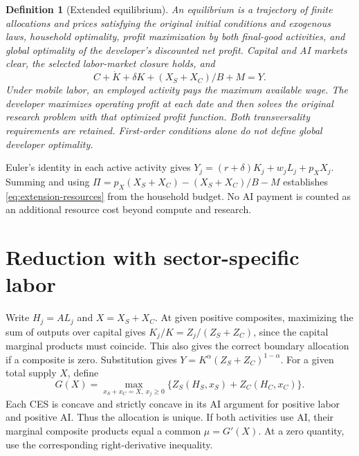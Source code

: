 \documentclass[11pt]{article}
\newtheorem{definition}{Definition}
\begin{document}
\begin{definition}[Extended equilibrium]
An equilibrium is a trajectory of finite allocations and prices satisfying
the original initial conditions and exogenous laws, household optimality,
profit maximization by both final-good activities, and global optimality
of the developer's discounted net profit. Capital and AI markets clear,
the selected labor-market closure holds, and
\begin{equation}
 C+\dot K+\delta K+(X_S+X_C)/B+M=Y.
 \label{eq:extension-resources}
\end{equation}
Under mobile labor, an employed activity pays the maximum available wage.
The developer maximizes operating profit at each date and then solves the
original research problem with that optimized profit function.
Both transversality requirements are retained. First-order conditions alone
do not define global developer optimality.
\end{definition}

Euler's identity in each active activity gives
$Y_j=(r+\delta)K_j+w_jL_j+p_XX_j$.
Summing and using $\Pi=p_X(X_S+X_C)-(X_S+X_C)/B-M$ establishes
\eqref{eq:extension-resources} from the household budget. No AI payment
is counted as an additional resource cost beyond compute and research.

\section{Reduction with sector-specific labor}
Write $H_j=AL_j$ and $X=X_S+X_C$.
At given positive composites, maximizing the sum of outputs over capital
gives $K_j/K=Z_j/(Z_S+Z_C)$, since the capital marginal products must
coincide. This also gives the correct boundary allocation if a composite
is zero. Substitution gives $Y=K^\alpha(Z_S+Z_C)^{1-\alpha}$.
For a given total supply $X$, define
\begin{equation}
 G(X)=\max_{x_S+x_C=X,\ x_j\geq0}
       \{Z_S(H_S,x_S)+Z_C(H_C,x_C)\}.
 \label{eq:extension-G}
\end{equation}
Each CES is concave and strictly concave in its AI argument for positive
labor and positive AI. Thus the allocation is unique. If both activities
use AI, their marginal composite products equal a common $\mu=G'(X)$.
At a zero quantity, use the corresponding right-derivative inequality.
\end{document}

